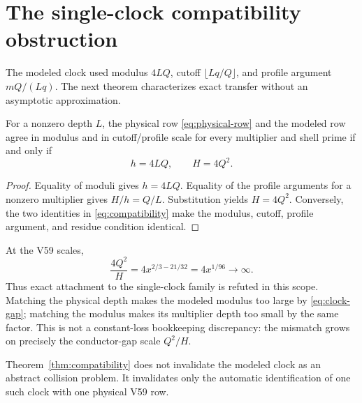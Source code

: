 \section{The single-clock compatibility obstruction}

The modeled clock used modulus $4LQ$, cutoff $\lfloor Lq/Q\rfloor$, and profile
argument $mQ/(Lq)$.  The next theorem characterizes exact transfer without an
asymptotic approximation.

\begin{theorem}\label{thm:compatibility}
For a nonzero depth $L$, the physical row \eqref{eq:physical-row} and the modeled row agree in modulus and
in cutoff/profile scale for every multiplier and shell prime if and only if
\begin{equation}
 h=4LQ,\qquad H=4Q^2.                                  \label{eq:compatibility}
\end{equation}
\end{theorem}

\begin{proof}
Equality of moduli gives $h=4LQ$.  Equality of the profile arguments for a nonzero
multiplier gives $H/h=Q/L$.  Substitution yields $H=4Q^2$.  Conversely, the two
identities in \eqref{eq:compatibility} make the modulus, cutoff, profile argument, and residue condition
identical.
\end{proof}

At the V59 scales,
\begin{equation}
 \frac{4Q^2}{H}=4x^{2/3-21/32}=4x^{1/96}\longrightarrow\infty. \label{eq:clock-gap}
\end{equation}
Thus exact attachment to the single-clock family is refuted in this scope.  Matching
the physical depth makes the modeled modulus too large by \eqref{eq:clock-gap}; matching the modulus
makes its multiplier depth too small by the same factor.  This is not a constant-loss
bookkeeping discrepancy: the mismatch grows on precisely the conductor-gap scale
$Q^2/H$.

Theorem~\ref{thm:compatibility} does not invalidate the modeled clock as an abstract
collision problem.  It invalidates only the automatic identification of one such
clock with one physical V59 row.
